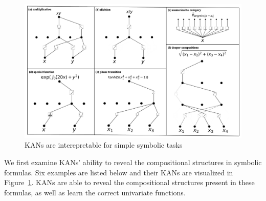 \documentclass{article}
\numberwithin{equation}{section}
\numberwithin{figure}{section}
\begin{document}
\begin{figure}[tbp]
    \centering
    \includegraphics[width=1\linewidth]{figs/interpretable_examples.png}
    \caption{KANs are interepretable for simple symbolic tasks}
    \label{fig:interpretable_examples}
\end{figure}

We first examine KANs' ability to reveal the compositional structures in symbolic formulas. Six examples are listed below and their KANs are visualized in Figure~\ref{fig:interpretable_examples}. KANs are able to reveal the compositional structures present in these formulas, as well as learn the correct univariate functions. 
\end{document}
